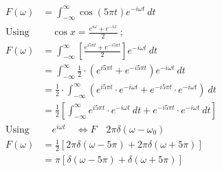 \documentclass[preview]{standalone}
\begin{document}
\begin{align*}
F(\omega)&=\int_{-\infty}^{\infty} \cos{(5\pi t)} e^{-i\omega t} \ dt \\ \textrm{Using}& \quad \cos{x}=\frac{e^{i\omega}+e^{-ix}}{2} \ ; \\ F(\omega)&=\int_{-\infty}^{\infty}\left[ \frac{e^{i5\pi t}+e^{-i5\pi t}}{2}\right] e^{-i\omega t} \ dt \\ &=\int_{-\infty}^{\infty} \frac{1}{2}\cdot (e^{i5\pi t}+e^{-i5\pi t})e^{-i\omega t} \ dt \\ &=\frac{1}{2}\cdot \int_{-\infty}^{\infty}(e^{i5\pi t}\cdot e^{-i\omega t}+e^{-i5\pi t}\cdot e^{-i\omega t}) \ dt \\ &=\frac{1}{2}\left[ \int_{-\infty}^{\infty}e^{i5\pi t}\cdot e^{-i\omega t} \ dt+e^{-i5\pi t}\cdot e^{-i\omega t} \ dt \right] \\ \textrm{Using}& \quad e^{i\omega t} \quad \Longleftrightarrow{F} \quad 2\pi \delta(\omega - \omega_{0}) \\ F(\omega)&=\frac{1}{2}\left[ 2\pi \delta(\omega-5\pi)+2\pi\delta(\omega+5\pi) \right] \\ &=\pi\left[\delta(\omega-5\pi)+\delta(\omega+5\pi)\right]
\end{align*}
\end{document}
